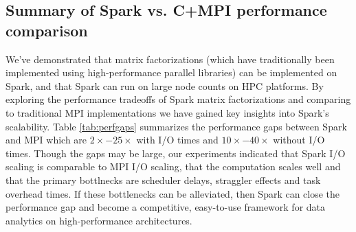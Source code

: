  \subsection{Summary of Spark vs. C+MPI performance comparison}
 \begin{table}[t]
\begin{center}
\end{center}
\caption{Overall summary of MPI and Spark performance gaps.}
\label{tab:perfgaps}
\end{table}
We've demonstrated that matrix factorizations (which have traditionally been implemented using high-performance parallel libraries) can be implemented on Spark, and that Spark can run on large node counts on HPC platforms. By exploring the performance tradeoffs of Spark matrix factorizations and comparing to traditional MPI implementations we have gained key insights into Spark's scalability. Table \ref{tab:perfgaps} summarizes the performance gaps between Spark and MPI which are $2\times - 25\times$ with I/O times and $10\times - 40\times$ without I/O times. Though the gaps may be large, our experiments indicated that Spark I/O scaling is comparable to MPI I/O scaling, that the computation scales well and that the primary bottlnecks are scheduler delays, straggler effects and task overhead times. If these bottlenecks can be alleviated, then Spark can close the performance gap and become a competitive, easy-to-use framework for data analytics on high-performance architectures.   

